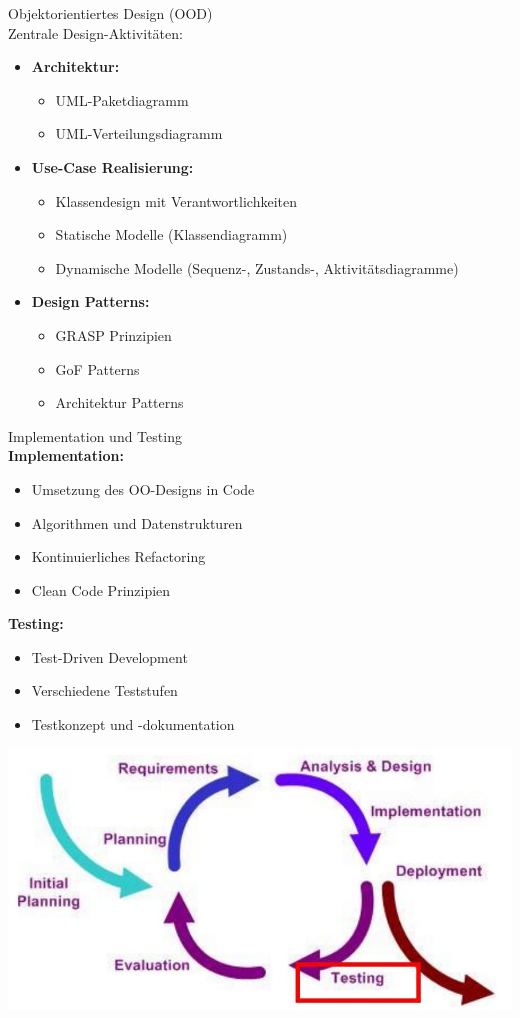 \begin{concept}{Objektorientiertes Design (OOD)}\\
Zentrale Design-Aktivitäten:
\begin{itemize}
    \item \textbf{Architektur:}
    \begin{itemize}
        \item UML-Paketdiagramm
        \item UML-Verteilungsdiagramm
    \end{itemize}
    \item \textbf{Use-Case Realisierung:}
    \begin{itemize}
        \item Klassendesign mit Verantwortlichkeiten
        \item Statische Modelle (Klassendiagramm)
        \item Dynamische Modelle (Sequenz-, Zustands-, Aktivitätsdiagramme)
    \end{itemize}
    \item \textbf{Design Patterns:}
    \begin{itemize}
        \item GRASP Prinzipien
        \item GoF Patterns
        \item Architektur Patterns
    \end{itemize}
\end{itemize}
\end{concept}

\begin{concept}{Implementation und Testing}\\
\textbf{Implementation:}
\begin{itemize}
    \item Umsetzung des OO-Designs in Code
    \item Algorithmen und Datenstrukturen
    \item Kontinuierliches Refactoring
    \item Clean Code Prinzipien
\end{itemize}
\textbf{Testing:}
\begin{itemize}
    \item Test-Driven Development
    \item Verschiedene Teststufen
    \item Testkonzept und -dokumentation
\end{itemize}
\includegraphics[width=0.8\linewidth]{images/2025_01_02_6eafa38dd4ae10c9a392g-15}
\end{concept}